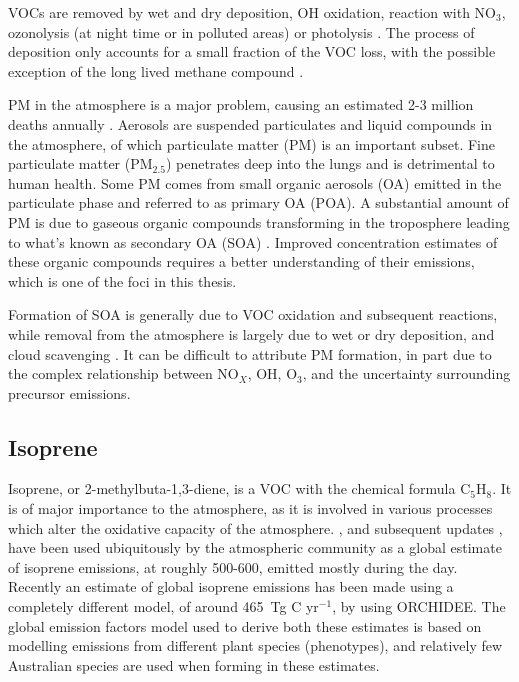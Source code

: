   VOCs are removed by wet and dry deposition, OH oxidation, reaction with NO$_3$, ozonolysis (at night time or in polluted areas) or photolysis \citep{AtkinsonArey2003, Brown2009}.
  The process of deposition only accounts for a small fraction of the VOC loss, with the possible exception of the long lived methane compound \citep{AtkinsonArey2003}.
  
  PM in the atmosphere is a major problem, causing an estimated 2-3 million deaths annually \citep{Hoek2013, Krewski2009, Silva2013, Lelieveld2015}. 
  Aerosols are suspended particulates and liquid compounds in the atmosphere, of which particulate matter (PM) is an important subset.
  Fine particulate matter (PM$_{2.5}$) penetrates deep into the lungs and is detrimental to human health.
  Some PM comes from small organic aerosols (OA) emitted in the particulate phase and referred to as primary OA (POA).
  A substantial amount of PM is due to gaseous organic compounds transforming in the troposphere leading to what's known as secondary OA (SOA) \citep{Kroll2008}.
  Improved concentration estimates of these organic compounds requires a better understanding of their emissions, which is one of the foci in this thesis.
  
  Formation of SOA is generally due to VOC oxidation and subsequent reactions, while removal from the atmosphere is largely due to wet or dry deposition, and cloud scavenging \citep{Kanakidou2005}.
  It can be difficult to attribute PM formation, in part due to the complex relationship between NO$_X$, OH, O$_3$, and the uncertainty surrounding precursor emissions.
  
  
  \subsection{Isoprene}
  \label{LR:VOCs:Isop}
    Isoprene, or 2-methylbuta-1,3-diene, is a VOC with the chemical formula C$_5$H$_8$. 
    It is of major importance to the atmosphere, as it is involved in various processes which alter the oxidative capacity of the atmosphere.
    \cite{Guenther1995}, and subsequent updates \citep{Guenther2000,Guenther2006,Guenther2012}, have been used ubiquitously by the atmospheric community as a global estimate of isoprene emissions, at roughly 500-600\tgpyr, emitted mostly during the day.
    Recently an estimate of global isoprene emissions has been made using a completely different model, of around 465~Tg C yr$^{-1}$, by \cite{Messina2016} using ORCHIDEE.
    The global emission factors model used to derive both these estimates is based on modelling emissions from different plant species (phenotypes), and relatively few Australian species are used when forming in these estimates.
    
